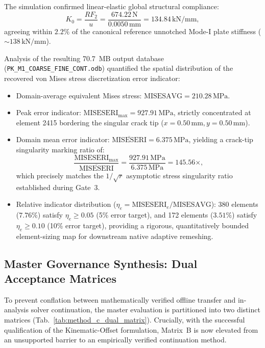 The simulation confirmed linear-elastic global structural compliance:
\begin{equation}
  K_0 = \frac{RF_2}{u} = \frac{674.22\,\mathrm{N}}{0.0050\,\mathrm{mm}} = 134.84\,\mathrm{kN/mm},
\end{equation}
agreeing within $2.2\%$ of the canonical reference unnotched Mode-I plate stiffness ($\sim 138\,\mathrm{kN/mm}$).

Analysis of the resulting 70.7~MB output database (\texttt{PK\_M1\_COARSE\_FINE\_CONT.odb}) quantified the spatial distribution of the recovered von Mises stress discretization error indicator:
\begin{itemize}
  \item Domain-average equivalent Mises stress: $\text{MISESAVG} = 210.28\,\mathrm{MPa}$.
  \item Peak error indicator: $\text{MISESERI}_{\max} = 927.91\,\mathrm{MPa}$, strictly concentrated at element 2415 bordering the singular crack tip ($x = 0.50\,\mathrm{mm}, y = 0.50\,\mathrm{mm}$).
  \item Domain mean error indicator: $\overline{\text{MISESERI}} = 6.375\,\mathrm{MPa}$, yielding a crack-tip singularity marking ratio of:
    \begin{equation}
      \frac{\text{MISESERI}_{\max}}{\overline{\text{MISESERI}}} = \frac{927.91\,\mathrm{MPa}}{6.375\,\mathrm{MPa}} = 145.56\times,
    \end{equation}
    which precisely matches the $1/\sqrt{r}$ asymptotic stress singularity ratio established during Gate~3.
  \item Relative indicator distribution ($\eta_e = \text{MISESERI}_e / \text{MISESAVG}$): 380 elements ($7.76\%$) satisfy $\eta_e \ge 0.05$ (5\% error target), and 172 elements ($3.51\%$) satisfy $\eta_e \ge 0.10$ (10\% error target), providing a rigorous, quantitatively bounded element-sizing map for downstream native adaptive remeshing.
\end{itemize}

\subsection{Master Governance Synthesis: Dual Acceptance Matrices}
\label{subsec:method_c_governance_synthesis}

To prevent conflation between mathematically verified offline transfer and in-analysis solver continuation, the master evaluation is partitioned into two distinct matrices (Tab.~\ref{tab:method_c_dual_matrix}). Crucially, with the successful qualification of the Kinematic-Offset formulation, Matrix~B is now elevated from an unsupported barrier to an empirically verified continuation method.

